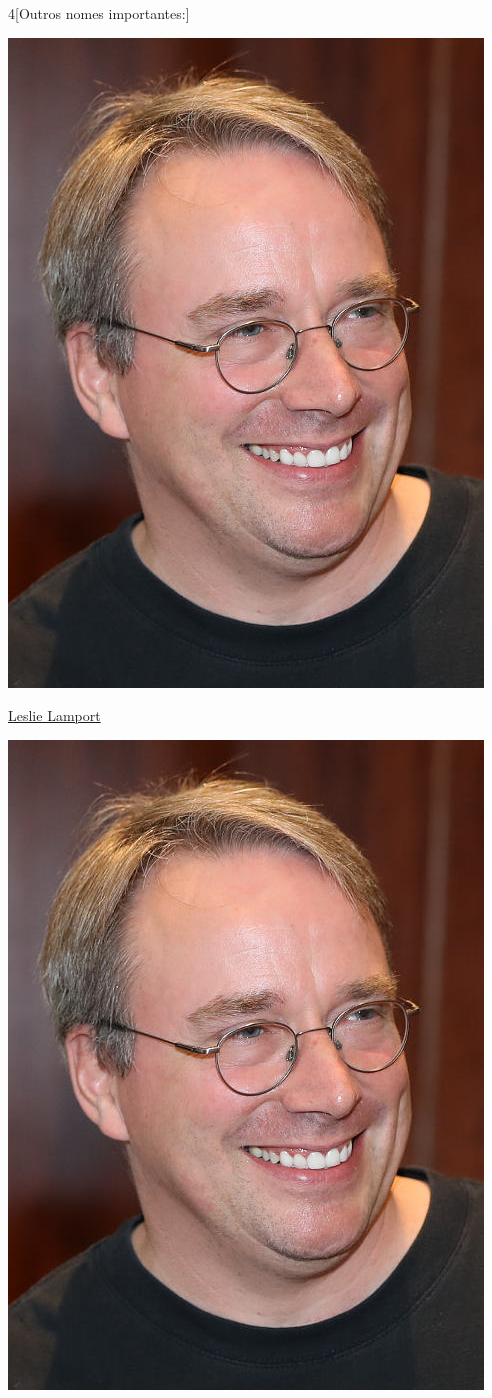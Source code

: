 \begin{multicols}{4}[Outros nomes importantes:]
\begin{center}
					\includegraphics[width=.8\columnwidth]{./IMG-GIT/CIENTISTAS/linus.jpeg}
\end{center}
				
\vfill\null
\columnbreak				
				
				\href{https://pt.wikipedia.org/wiki/Leslie_Lamport}{Leslie Lamport}
				
\begin{center}
					\includegraphics[width=.8\columnwidth]{./IMG-GIT/CIENTISTAS/linus.jpeg}
\end{center}
				

\end{multicols}

